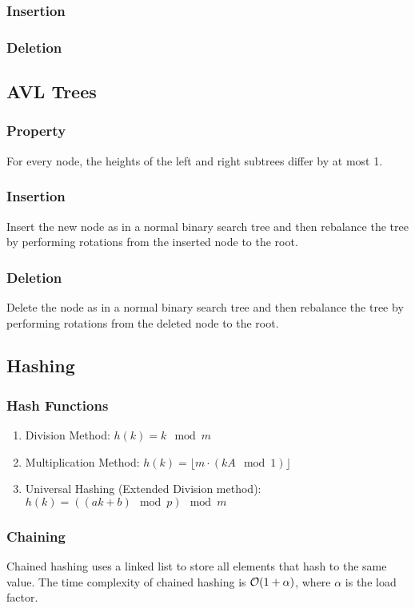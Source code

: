 \documentclass{article}
\begin{document}
\subsubsection{Insertion}


\subsubsection{Deletion}


\subsection{AVL Trees}
\subsubsection{Property}
For every node, the heights of the left and right subtrees differ by at most 1.

\subsubsection{Insertion}
Insert the new node as in a normal binary search tree and then rebalance the tree by performing rotations from the inserted node to the root.

\subsubsection{Deletion}
Delete the node as in a normal binary search tree and then rebalance the tree by performing rotations from the deleted node to the root.

\subsection{Hashing}
\subsubsection{Hash Functions}
\begin{enumerate}
  \item Division Method: $h(k) = k \mod m$
  \item Multiplication Method: $h(k) = \lfloor m \cdot (kA \mod 1) \rfloor$
  \item Universal Hashing (Extended Division method): $h(k) = ((ak+b) \mod p) \mod m$
\end{enumerate}

\subsubsection{Chaining}\label{sec:chaining}
Chained hashing uses a linked list to store all elements that hash to the same value. The time complexity of chained hashing is $\mathcal{O}(1+\alpha)$, where $\alpha$ is the load factor.
\end{document}
